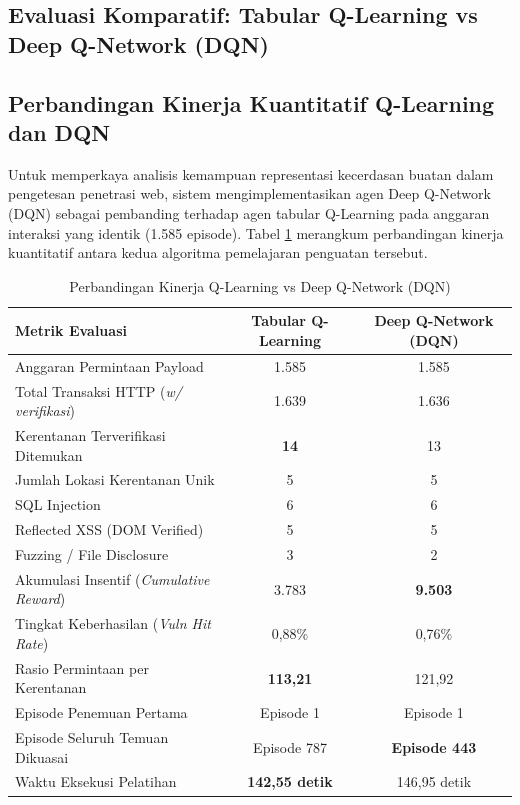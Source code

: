 \begin{enumerate}
\section{Evaluasi Komparatif: Tabular Q-Learning vs Deep Q-Network (DQN)}

\subsection{Perbandingan Kinerja Kuantitatif Q-Learning dan DQN}

Untuk memperkaya analisis kemampuan representasi kecerdasan buatan dalam pengetesan penetrasi web, sistem mengimplementasikan agen Deep Q-Network (DQN) sebagai pembanding terhadap agen tabular Q-Learning pada anggaran interaksi yang identik (1.585 episode). Tabel \ref{tab:comparison_ql_dqn} merangkum perbandingan kinerja kuantitatif antara kedua algoritma pemelajaran penguatan tersebut.

\begin{table}[htbp]
\centering
\caption{Perbandingan Kinerja Q-Learning vs Deep Q-Network (DQN)}
\label{tab:comparison_ql_dqn}
\small %
\setlength{\tabcolsep}{6pt} %
\begin{tabular}{l c c}
\toprule
\textbf{Metrik Evaluasi} & \textbf{Tabular Q-Learning} & \textbf{Deep Q-Network (DQN)} \\
\midrule
Anggaran Permintaan Payload & 1.585 & 1.585 \\
Total Transaksi HTTP (\textit{w/ verifikasi}) & 1.639 & 1.636 \\ 
Kerentanan Terverifikasi Ditemukan & \textbf{14} & 13 \\ 
Jumlah Lokasi Kerentanan Unik & 5 & 5 \\
SQL Injection & 6 & 6 \\
Reflected XSS (DOM Verified) & 5 & 5 \\ 
Fuzzing / File Disclosure & 3 & 2 \\
Akumulasi Insentif (\textit{Cumulative Reward}) & 3.783 & \textbf{9.503} \\ 
Tingkat Keberhasilan (\textit{Vuln Hit Rate}) & 0,88\% & 0,76\% \\ 
Rasio Permintaan per Kerentanan & \textbf{113,21} & 121,92 \\ 
Episode Penemuan Pertama & Episode 1 & Episode 1 \\
Episode Seluruh Temuan Dikuasai & Episode 787 & \textbf{Episode 443} \\
Waktu Eksekusi Pelatihan & \textbf{142,55 detik} & 146,95 detik \\ 
\bottomrule
\end{tabular}
\end{table}


\end{enumerate}
